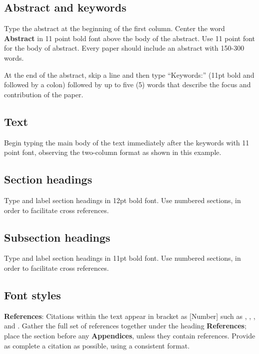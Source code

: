 \documentclass[11pt,a4paper]{article}
\begin{document}
\subsection{Abstract and keywords}

Type the abstract at the beginning of the first column.  Center the word
{\bf Abstract} in 11 point bold font above the body of the abstract.
Use 11 point font for the body of abstract.  Every paper should include
an abstract with 150-300 words.  

At the end of the abstract, skip a line and then type ``Keywords:''
(11pt bold and followed by a colon) followed by up to five (5) words
that describe the focus and contribution of the paper.

\subsection{Text}

Begin typing the main body of the text immediately after the keywords
with 11 point font, observing the two-column format as shown in this
example.

\subsection{Section headings}

Type and label section headings in 12pt bold font.  Use numbered
sections, in order to facilitate cross references.

\subsection{Subsection headings}

Type and label section headings in 11pt bold font.  Use numbered
sections, in order to facilitate cross references.

\subsection{Font styles}

{\bf References}: Citations within the text appear in bracket as
[Number] such as \cite{ACM:83}, \cite{APA}, \cite{Vichet_2015}, \cite{Ye_KhmerSMT_2015} and \cite{Ye_KhmerPOS_2017}.  Gather the full set of references together under the heading {\bf References}; place the section before any {\bf Appendices}, unless they contain references. Provide as complete a citation as possible, using a consistent format.
\end{document}
